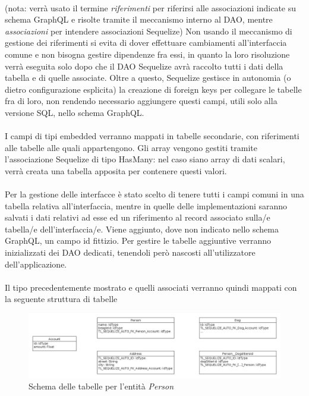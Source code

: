 \documentclass[a4paper, 12pt]{report}
\begin{document}
      \paragraph*{}
      (nota: verrà usato il termine \emph{riferimenti} per riferirsi alle associazioni indicate su schema GraphQL e risolte tramite il meccanismo interno al DAO, mentre \emph{associazioni} per intendere associazioni Sequelize)
      Non usando il meccanismo di gestione dei riferimenti si evita di dover effettuare cambiamenti all'interfaccia comune e non bisogna gestire dipendenze fra essi, in quanto la loro risoluzione verrà eseguita solo dopo che il DAO Sequelize avrà raccolto tutti i dati della tabella e di quelle associate.
      Oltre a questo, Sequelize gestisce in autonomia (o dietro configurazione esplicita) la creazione di foreign keys per collegare le tabelle fra di loro, non rendendo necessario aggiungere questi campi, utili solo alla versione SQL, nello schema GraphQL.
      \paragraph*{}
      I campi di tipi embedded verranno mappati in tabelle secondarie, con riferimenti alle tabelle alle quali appartengono.
      Gli array vengono gestiti tramite l'associazione Sequelize di tipo HasMany: nel caso siano array di dati scalari, verrà creata una tabella apposita per contenere questi valori.
      \paragraph*{}
      Per la gestione delle interfacce è stato scelto di tenere tutti i campi comuni in una tabella relativa all'interfaccia, mentre in quelle delle implementazioni saranno salvati i dati relativi ad esse ed un riferimento al record associato sulla/e tabella/e dell'interfaccia/e.
      Viene aggiunto, dove non indicato nello schema GraphQL, un campo id fittizio.
      Per gestire le tabelle aggiuntive verranno inizializzati dei DAO dedicati, tenendoli però nascosti all'utilizzatore dell'applicazione.
      \paragraph*{}
      Il tipo precedentemente mostrato e quelli associati verranno quindi mappati con la seguente struttura di tabelle
      \begin{figure}[H]
        \includegraphics[width=\textwidth]{db-example.jpg}
        \caption{Schema delle tabelle per l'entità \emph{Person}}
      \end{figure}
\end{document}
